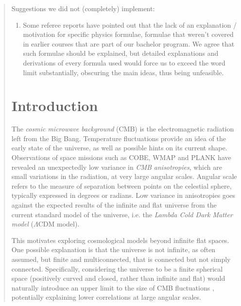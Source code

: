 \documentclass{article}
\theoremstyle{definition}
\begin{document}
\begin{abstract}
Suggestions we did not (completely) implement: \begin{enumerate}
    \item Some referee reports have pointed out that the lack of an explanation / motivation for specific physics formulae, formulae that weren't covered in earlier courses that are part of our bachelor program. We agree that such formulae should be explained, but detailed explanations and derivations of every formula used would force us to exceed the word limit substantially, obscuring the main ideas, thus being unfeasible.
\end{enumerate}

\newpage




\newpage
\section{Introduction}
The \textit{cosmic microwave background} (CMB) is the electromagnetic radiation left from the Big Bang.  Temperature fluctuations provide an idea of the early state of the universe, as well as possible hints on its current shape. Observations of space missions such as COBE, WMAP and PLANK have revealed an unexpectedly low variance in \textit{CMB anisotropies}, which are small variations in the radiation, at very large angular scales. Angular scale refers to the measure of separation between points on the celestial sphere, typically expressed in degrees or radians. Low variance in anisotropies goes against the expected results of the infinite and flat universe from the current standard model of the universe, i.e. the \textit{Lambda Cold Dark Matter model} ($\Lambda$CDM model).

This motivates exploring cosmological models beyond infinite flat spaces. One possible explanation is that the universe is not infinite, as often assumed, but finite and multiconnected, that is connected but not simply connected. Specifically, considering the universe to be a finite spherical space (positively curved and closed, rather than infinite and flat) would  naturally introduce an upper limit to the size of CMB fluctuations \cite{aurich_2012}\cite{aurich_2005}, potentially explaining lower correlations at large angular scales.


\end{abstract}
\end{document}
